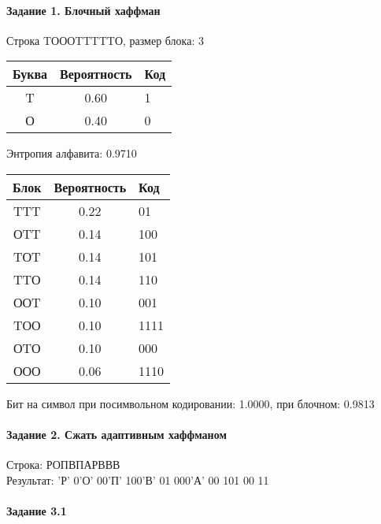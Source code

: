 \documentclass[a4paper, 12pt]{article}
\begin{document}
\paragraph{Задание 1. Блочный хаффман \\}

Строка TОООTTTTTО, размер блока: 3
\begin{center}
 \begin{tabular}{ |c|c|l| } 
  \hline
     Буква & Вероятность & Код\\ \hline
T & 0.60 & 1\\\hline
О & 0.40 & 0
\\ \hline \end{tabular}
\end{center}
Энтропия алфавита: 0.9710
\begin{center}
 \begin{tabular}{ |c|c|l| } 
  \hline
     Блок & Вероятность & Код\\ \hline
TTT & 0.22 & 01\\\hline
ОTT & 0.14 & 100\\\hline
TОT & 0.14 & 101\\\hline
TTО & 0.14 & 110\\\hline
ООT & 0.10 & 001\\\hline
TОО & 0.10 & 1111\\\hline
ОTО & 0.10 & 000\\\hline
ООО & 0.06 & 1110
\\ \hline \end{tabular}
\end{center}
Бит на символ при посимвольном кодировании: 1.0000, при блочном: 0.9813


\pagebreak
\paragraph{Задание 2. Сжать адаптивным хаффманом\\}

Строка: 
РОПВПАРВВВ\\
Результат: 'Р' 0'О' 00'П' 100'В' 01 000'А' 00 101 00 11










\pagebreak
\paragraph{Задание 3.1}
\end{document}
